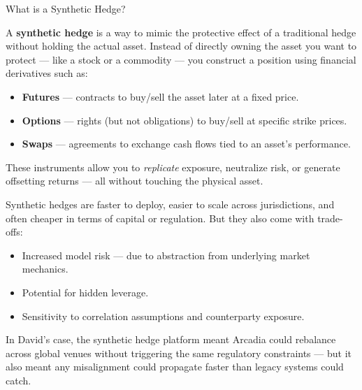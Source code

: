 \begin{TechnicalSidebar}{What is a Synthetic Hedge?}

  A \textbf{synthetic hedge} is a way to mimic the protective effect of a traditional hedge without holding the actual asset.  
  Instead of directly owning the asset you want to protect — like a stock or a commodity — you construct a position 
  using financial derivatives such as:

  \medskip

  \begin{itemize}
    \item \textbf{Futures} — contracts to buy/sell the asset later at a fixed price.
    \item \textbf{Options} — rights (but not obligations) to buy/sell at specific strike prices.
    \item \textbf{Swaps} — agreements to exchange cash flows tied to an asset’s performance.
  \end{itemize}

  \medskip

  These instruments allow you to \textit{replicate} exposure, neutralize risk, or generate offsetting returns — all without 
  touching the physical asset.

  \medskip

  Synthetic hedges are faster to deploy, easier to scale across jurisdictions, and often cheaper in terms of capital 
  or regulation. But they also come with trade-offs:

  \medskip

  \begin{itemize}
    \item Increased model risk — due to abstraction from underlying market mechanics.
    \item Potential for hidden leverage.
    \item Sensitivity to correlation assumptions and counterparty exposure.
  \end{itemize}

  \medskip

  In David’s case, the synthetic hedge platform meant Arcadia could rebalance across global venues without triggering 
  the same regulatory constraints — but it also meant any misalignment could propagate faster than legacy systems 
  could catch.

\end{TechnicalSidebar}

\medskip

